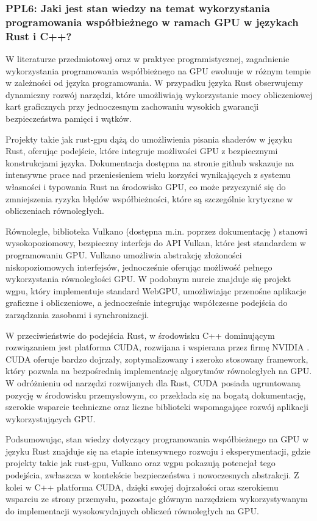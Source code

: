 \subsubsection{PPL6: Jaki jest stan wiedzy na temat wykorzystania programowania współbieżnego w ramach GPU w językach Rust i C++?}
W literaturze przedmiotowej oraz w praktyce programistycznej, zagadnienie wykorzystania programowania współbieżnego na GPU ewoluuje w różnym tempie w zależności od języka programowania. W przypadku języka Rust obserwujemy dynamiczny rozwój narzędzi, które umożliwiają wykorzystanie mocy obliczeniowej kart graficznych przy jednoczesnym zachowaniu wysokich gwarancji bezpieczeństwa pamięci i wątków.

Projekty takie jak rust‑gpu \cite{rustgpuRust} dążą do umożliwienia pisania shaderów w języku Rust, oferując podejście, które integruje możliwości GPU z bezpiecznymi konstrukcjami języka. Dokumentacja dostępna na stronie github \cite{rustgpuRust} wskazuje na intensywne prace nad przeniesieniem wielu korzyści wynikających z systemu własności i typowania Rust na środowisko GPU, co może przyczynić się do zmniejszenia ryzyka błędów współbieżności, które są szczególnie krytyczne w obliczeniach równoległych.

Równolegle, biblioteka Vulkano (dostępna m.in. poprzez dokumentację \cite{docsVulkanoRust}) stanowi wysokopoziomowy, bezpieczny interfejs do API Vulkan, które jest standardem w programowaniu GPU. Vulkano umożliwia abstrakcję złożoności niskopoziomowych interfejsów, jednocześnie oferując możliwość pełnego wykorzystania równoległości GPU. W podobnym nurcie znajduje się projekt wgpu, który implementuje standard WebGPU, umożliwiając przenośne aplikacje graficzne i obliczeniowe, a jednocześnie integrując współczesne podejścia do zarządzania zasobami i synchronizacji.

W przeciwieństwie do podejścia Rust, w środowisku C++ dominującym rozwiązaniem jest platforma CUDA, rozwijana i wspierana przez firmę NVIDIA \cite{nvidiaCUDAToolkit}. CUDA oferuje bardzo dojrzały, zoptymalizowany i szeroko stosowany framework, który pozwala na bezpośrednią implementację algorytmów równoległych na GPU. W odróżnieniu od narzędzi rozwijanych dla Rust, CUDA posiada ugruntowaną pozycję w środowisku przemysłowym, co przekłada się na bogatą dokumentację, szerokie wsparcie techniczne oraz liczne biblioteki wspomagające rozwój aplikacji wykorzystujących GPU.

Podsumowując, stan wiedzy dotyczący programowania współbieżnego na GPU w języku Rust znajduje się na etapie intensywnego rozwoju i eksperymentacji, gdzie projekty takie jak rust‑gpu, Vulkano oraz wgpu \cite{wgpuWgpuPortable} pokazują potencjał tego podejścia, zwłaszcza w kontekście bezpieczeństwa i nowoczesnych abstrakcji. Z kolei w C++ platforma CUDA, dzięki swojej dojrzałości oraz szerokiemu wsparciu ze strony przemysłu, pozostaje głównym narzędziem wykorzystywanym do implementacji wysokowydajnych obliczeń równoległych na GPU.

